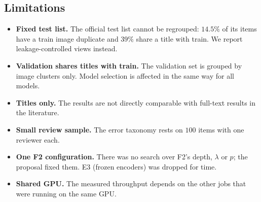 \subsection{Limitations}
\label{sec:limits}

\begin{itemize}
  \item \textbf{Fixed test list.} The official test list cannot be regrouped: $14.5\%$ of its items have a train
        image duplicate and $39\%$ share a title with train. We report leakage-controlled views instead.
  \item \textbf{Validation shares titles with train.} The validation set is grouped by image clusters only. Model
        selection is affected in the same way for all models.
  \item \textbf{Titles only.} The results are not directly comparable with full-text results in the literature.
  \item \textbf{Small review sample.} The error taxonomy rests on $100$ items with one reviewer each.
  \item \textbf{One F2 configuration.} There was no search over F2's depth, $\lambda$ or $p$; the proposal fixed
        them. E3 (frozen encoders) was dropped for time.
  \item \textbf{Shared GPU.} The measured throughput depends on the other jobs that were running on the same GPU.
\end{itemize}
